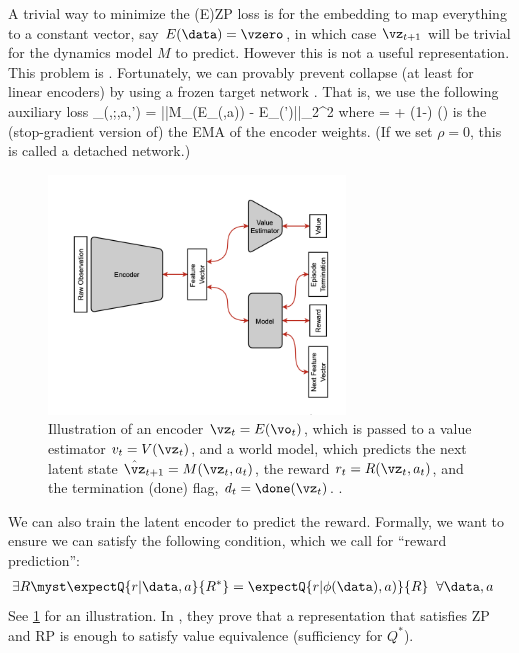 A trivial way to minimize the (E)ZP loss is for the embedding
to map everything to a constant vector, say $E(\hist)=\vzero$,
in which case $\vz_{t+1}$ will be trivial for  the
dynamics model $M$ to predict.
However this is not a useful representation.
This problem is 
\citep{Jing2022collapse}.
Fortunately,
we can provably prevent collapse (at least for linear encoders)
by using a frozen target network 
\citep{Tang2023,Ni2024}. That is, we use the following auxiliary
loss
\be
\loss_{}(\vphi,\vtheta;\hist,a,\hist')
= ||M_{\vtheta}(E_{\vphi}(\hist,a)) - E_{\overline{\vphi}}(\hist')||_2^2
\ee
where 
\be
\overline{\vphi}=\rho \overline{\vphi} + (1-\rho) \stopgrad(\vphi)
\ee
is the (stop-gradient version of) the EMA
of the encoder weights.
(If we set $\rho=0$, this is called a detached network.)


\begin{figure}
\centering
\includegraphics[height=2.5in]{figs/MBRLtargets.png}
\caption{
  Illustration of  an encoder $\vz_t=E(\vo_t)$,
  which is passed to a value estimator $v_t=V(\vz_t)$,
  and a world model, which predicts
  the next latent state $\hat{\vz}_{t+1}=M(\vz_t,a_t)$,
  the reward $r_t=R(\vz_t,a_t)$,
  and the termination (done) flag, $d_t=\done(\vz_t)$.
.
}
\label{fig:MBRLtargets}
\end{figure}

We can also train the latent encoder to predict the reward.
Formally, we want to ensure we can satisfy the following condition,
which we call  for ``reward prediction'':
\begin{align}
  \exists R \myst  \expectQ{r|\hist,a}{R^*} &=
  \expectQ{r|\phi(\hist),a)}{R} \;\; \forall \hist,a
\end{align}
See \cref{fig:MBRLtargets} for an illustration.
In \citep{Ni2024}, they prove that a representation
that satisfies ZP and RP is enough to satisfy value equivalence
(sufficiency for $Q^*$).

